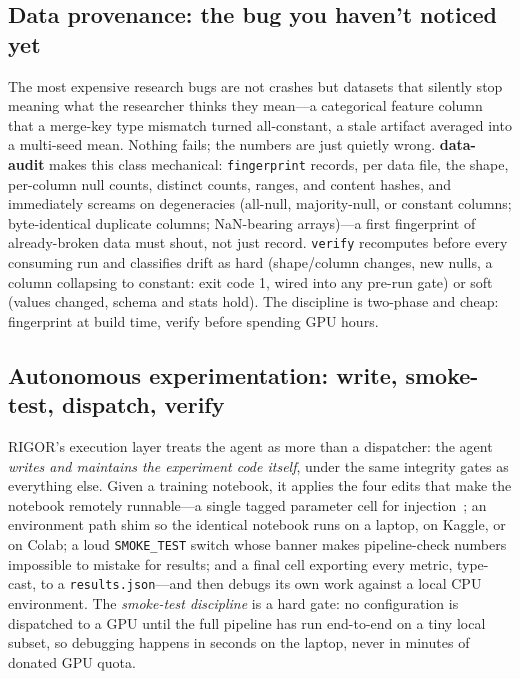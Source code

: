\documentclass[11pt]{article}
\begin{document}
\subsection{Data provenance: the bug you haven't noticed yet}
\label{sec:data}

The most expensive research bugs are not crashes but datasets that silently
stop meaning what the researcher thinks they mean---a categorical feature
column that a merge-key type mismatch turned all-constant, a stale artifact
averaged into a multi-seed mean. Nothing fails; the numbers are just quietly
wrong. \textbf{data-audit} makes this class mechanical: \texttt{fingerprint}
records, per data file, the shape, per-column null counts, distinct counts,
ranges, and content hashes, and immediately screams on degeneracies
(all-null, majority-null, or constant columns; byte-identical duplicate
columns; NaN-bearing arrays)---a first fingerprint of already-broken data
must shout, not just record. \texttt{verify} recomputes before every
consuming run and classifies drift as hard (shape/column changes, new nulls,
a column collapsing to constant: exit code 1, wired into any pre-run gate) or
soft (values changed, schema and stats hold). The discipline is two-phase and
cheap: fingerprint at build time, verify before spending GPU hours.

\subsection{Autonomous experimentation: write, smoke-test, dispatch, verify}
\label{sec:auto}

RIGOR's execution layer treats the agent as more than a dispatcher: the agent
\emph{writes and maintains the experiment code itself}, under the same
integrity gates as everything else. Given a training notebook, it applies the
four edits that make the notebook remotely runnable---a single tagged
parameter cell for injection~\cite{papermill}; an environment path shim so
the identical notebook runs on a laptop, on Kaggle, or on Colab; a loud
\texttt{SMOKE\_TEST} switch whose banner makes pipeline-check numbers
impossible to mistake for results; and a final cell exporting every metric,
type-cast, to a \texttt{results.json}---and then debugs its own work against
a local CPU environment. The \emph{smoke-test discipline} is a hard gate: no
configuration is dispatched to a GPU until the full pipeline has run
end-to-end on a tiny local subset, so debugging happens in seconds on the
laptop, never in minutes of donated GPU quota.
\end{document}
